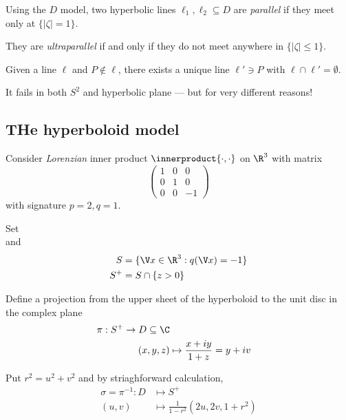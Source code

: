 \documentclass[a4paper]{article}
\theoremstyle{definition}
\newcommand*{\inner}{\innerproduct}
\begin{document}
\begin{definition}
  Using the \(D\) model, two hyperbolic lines \(\ell_1, \ell_2 \subseteq D\) are \emph{parallel} if they meet only at \(\{|\zeta| = 1\}\).

  They are \emph{ultraparallel} if and only if they do not meet anywhere in \(\{|\zeta| \leq 1\}\).
\end{definition}

\begin{axiom}
  Given a line \(\ell\) and \(P \notin \ell\), there exists a unique line \(\ell' \ni P\) with \(\ell \cap \ell' = \emptyset\).
\end{axiom}

It fails in both \(S^2\) and hyperbolic plane --- but for very different reasons!

\subsection{THe hyperboloid model}

Consider \emph{Lorenzian} inner product \(\inner{\cdot, \cdot}\) on \(\R^3\) with matrix
\[
  \begin{pmatrix}
    1 & 0 & 0 \\
    0 & 1 & 0 \\
    0 & 0 & -1
  \end{pmatrix}
\]
with signature \(p = 2, q = 1\).

Set
\[
\]
and
\begin{align*}
  S &= \{\V x \in \R^3: q(\V x) = -1\} \\
  S^+ &= S \cap \{z > 0\}
\end{align*}

Define a projection from the upper sheet of the hyperboloid to the unit disc in the complex plane
\begin{align*}
  \pi: S^+ \to D \subseteq \C \\
  (x, y, z) &\mapsto \frac{x + iy}{1 + z} = y + iv
\end{align*}

Put \(r^2 = u^2 + v^2\) and by striaghforward calculation,
\begin{align*}
  \sigma = \pi^{-1}: D &\mapsto S^+ \\
  (u, v) &\mapsto \frac{1}{1 - r^2} (2u, 2v, 1 + r^2) 
\end{align*}
\end{document}
